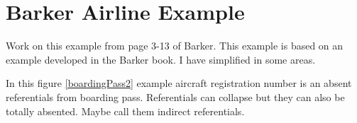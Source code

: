 \section{Barker Airline Example}
\label{BarkerAirlineExample}

\mynote Work on this example from page 3-13 of Barker.
{This example is based on an example developed in the Barker book. I have simplified in some areas.}


\begin{noteforfuture}
In this figure \ref{boardingPass2} example aircraft registration number is an absent referentials from
boarding pass. Referentials can collapse but they can also be totally absented. Maybe call them indirect referentials. 
\end{noteforfuture}


